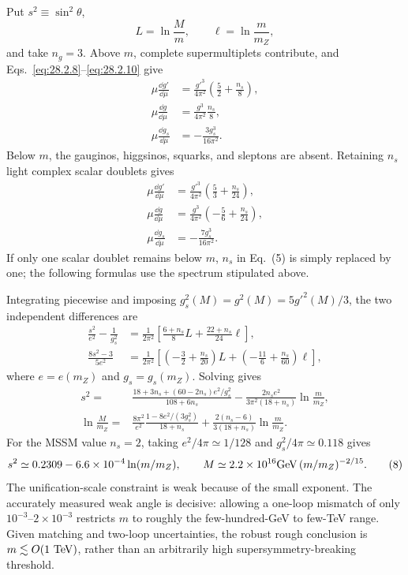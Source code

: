 \begin{enumerate}
  Put \(s^2\equiv\sin^2\theta\),
  \[
    L=\ln\frac{M}{m},\qquad \ell=\ln\frac{m}{m_Z},
  \]
  and take \(n_g=3\).  Above \(m\), complete supermultiplets contribute,
  and Eqs.~\eqref{eq:28.2.8}--\eqref{eq:28.2.10} give
  \[
  \begin{aligned}
    \mu\frac{\dd g'}{\dd\mu}
      &=\frac{g'^3}{4\pi^2}
        \left(\frac52+\frac{n_s}{8}\right),\\
    \mu\frac{\dd g}{\dd\mu}
      &=\frac{g^3}{4\pi^2}\frac{n_s}{8},\\
    \mu\frac{\dd g_s}{\dd\mu}
      &=-\frac{3g_s^3}{16\pi^2}.
  \end{aligned}
    \tag{4}
  \]
  Below \(m\), the gauginos, higgsinos, squarks, and sleptons are absent.
  Retaining \(n_s\) light complex scalar doublets gives
  \[
  \begin{aligned}
    \mu\frac{\dd g'}{\dd\mu}
      &=\frac{g'^3}{4\pi^2}
        \left(\frac53+\frac{n_s}{24}\right),\\
    \mu\frac{\dd g}{\dd\mu}
      &=\frac{g^3}{4\pi^2}
        \left(-\frac56+\frac{n_s}{24}\right),\\
    \mu\frac{\dd g_s}{\dd\mu}
      &=-\frac{7g_s^3}{16\pi^2}.
  \end{aligned}
    \tag{5}
  \]
  If only one scalar doublet remains below \(m\), \(n_s\) in Eq.~(5)
  is simply replaced by one; the following formulas use the spectrum
  stipulated above.

  Integrating piecewise and imposing
  \(g_s^2(M)=g^2(M)=5g'^2(M)/3\), the two independent differences are
  \[
  \begin{aligned}
    \frac{s^2}{e^2}-\frac1{g_s^2}
      &=\frac1{2\pi^2}
        \left[
          \frac{6+n_s}{8}L
          +\frac{22+n_s}{24}\ell
        \right],\\
    \frac{8s^2-3}{5e^2}
      &=\frac1{2\pi^2}
        \left[
          \left(-\frac32+\frac{n_s}{20}\right)L
          +\left(-\frac{11}{6}+\frac{n_s}{60}\right)\ell
        \right],
  \end{aligned}
    \tag{6}
  \]
  where \(e=e(m_Z)\) and \(g_s=g_s(m_Z)\).  Solving gives
  \[
  \begin{aligned}
    s^2={}&
    \frac{18+3n_s+(60-2n_s)e^2/g_s^2}{108+6n_s}
    -\frac{2n_se^2}{3\pi^2(18+n_s)}
      \ln\frac{m}{m_Z},\\
    \ln\frac{M}{m_Z}={}&
    \frac{8\pi^2}{e^2}
      \frac{1-8e^2/(3g_s^2)}{18+n_s}
    +\frac{2(n_s-6)}{3(18+n_s)}
      \ln\frac{m}{m_Z}.
  \end{aligned}
    \tag{7}
  \]
  For the MSSM value \(n_s=2\), taking
  \(e^2/4\pi\simeq1/128\) and \(g_s^2/4\pi\simeq0.118\) gives
  \[
    s^2\simeq0.2309-6.6\times10^{-4}\ln(m/m_Z),
    \qquad
    M\simeq2.2\times10^{16}{\rm GeV}\,
      (m/m_Z)^{-2/15}.
    \tag{8}
  \]
  The unification-scale constraint is weak because of the small exponent.
  The accurately measured weak angle is decisive: allowing a one-loop
  mismatch of only \(10^{-3}\)--\(2\times10^{-3}\) restricts \(m\) to
  roughly the few-hundred-GeV to few-TeV range.  Given matching and
  two-loop uncertainties, the robust rough conclusion is
  \(m\lesssim O(1\ {\rm TeV})\), rather than an arbitrarily high
  supersymmetry-breaking threshold.


\end{enumerate}
